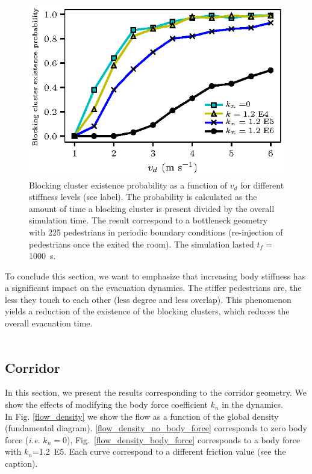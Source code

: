 \documentclass[preprint,12pt]{elsarticle}
\begin{document}
\begin{figure}[htbp!]
\centering
\includegraphics[width=0.7\columnwidth]
{./pbc_vs_vd_multi_kn.eps}
\caption{\label{pbc_vs_vd_multi_kn} Blocking cluster existence probability as a function of $v_d$ for different stiffness levels (see label). The probability is calculated as the amount of time a blocking cluster is present divided by the overall simulation time. The result correspond to a bottleneck geometry with 225 pedestrians in periodic boundary conditions (re-injection of pedestrians once the exited the room). The simulation lasted $t_f =$ 1000~s. }
\end{figure}


To conclude this section, we want to emphasize that increasing body stiffness has a significant impact on the evacuation dynamics. The stiffer pedestrians are, the less they touch to each other (less degree and less overlap). This phenomenon yields a reduction of the existence of the blocking clusters, which reduces the overall evacuation time. \\
\\

\subsection{\label{corridor} Corridor}

In this section, we present the results corresponding to the corridor geometry. We show the effects of modifying the body force coefficient $k_n$ in the dynamics.\\

In Fig. \ref{flow_density} we show the flow as a function of the global density (fundamental diagram). \ref{flow_density_no_body_force} corresponds to zero body force (\textit{i.e.} $k_n=0$), Fig.~\ref{flow_density_body_force} corresponds to a body force with $k_n$=1.2~E5. Each curve correspond to a different friction value (see the caption).\\
\end{document}
